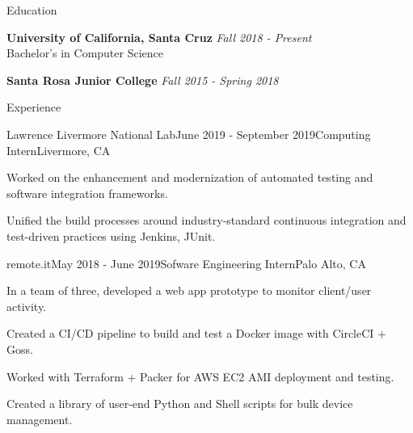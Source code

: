 \documentclass{resume} %
\begin{document}

\begin{rSection}{Education}

{\bf University of California, Santa Cruz} \hfill {\em Fall 2018 - Present} \\ 
Bachelor's in Computer Science

{\bf Santa Rosa Junior College} \hfill {\em Fall 2015 - Spring 2018}

\end{rSection}


\begin{rSection}{Experience}

\begin{rSubsection}{Lawrence Livermore National Lab}{June 2019 - September 2019}{Computing Intern}{Livermore, CA}
    \item Worked on the enhancement and modernization of automated testing and software integration frameworks.
    \item Unified the build processes around industry-standard continuous integration and test-driven practices using Jenkins, JUnit.
\end{rSubsection}


\begin{rSubsection}{remote.it}{May 2018 - June 2019}{Sofware Engineering Intern}{Palo Alto, CA}
    \item In a team of three, developed a web app prototype to monitor client/user activity.
    \item Created a CI/CD pipeline to build and test a Docker image with CircleCI + Goss.
    \item Worked with Terraform + Packer for AWS EC2 AMI deployment and testing.
    \item Created a library of user-end Python and Shell scripts for bulk device management.
\end{rSubsection}

\end{rSection}
\end{document}
